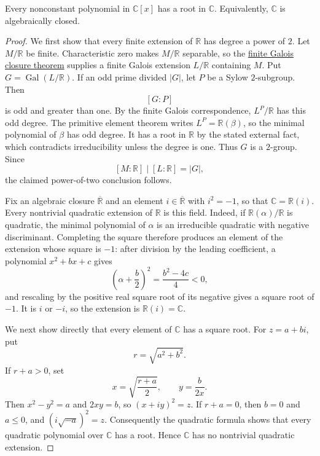 \begin{applicationtheorem}
Every nonconstant polynomial in \(\mathbb C[x]\) has a root in \(\mathbb C\).
Equivalently, \(\mathbb C\) is algebraically closed.
\end{applicationtheorem}
\begin{proof}
We first show that every finite extension of \(\mathbb R\) has degree a power
of \(2\).  Let \(M/\mathbb R\) be finite.  Characteristic zero makes
\(M/\mathbb R\) separable, so the
\hyperref[thm:finite-galois-closure]{finite Galois closure theorem} supplies
a finite Galois extension \(L/\mathbb R\) containing \(M\).  Put
\(G=\operatorname{Gal}(L/\mathbb R)\).
If an odd prime divided \(|G|\), let \(P\) be a Sylow \(2\)-subgroup.  Then
\[
[G:P]
\]
is odd and greater than one.  By the finite Galois correspondence,
\(L^P/\mathbb R\) has this odd degree.  The primitive element theorem writes
\(L^P=\mathbb R(\beta)\), so the minimal polynomial of \(\beta\) has odd
degree.  It has a root in \(\mathbb R\) by the stated external fact, which
contradicts irreducibility unless the degree is one.  Thus \(G\) is a
\(2\)-group.  Since
\[
[M:\mathbb R]\mid[L:\mathbb R]=|G|,
\]
the claimed power-of-two conclusion follows.

Fix an algebraic closure \(\overline{\mathbb R}\) and an element
\(i\in\overline{\mathbb R}\) with \(i^2=-1\), so that
\(\mathbb C=\mathbb R(i)\).  Every nontrivial quadratic extension of
\(\mathbb R\) is this field.  Indeed, if \(\mathbb R(\alpha)/\mathbb R\) is
quadratic, the minimal polynomial of \(\alpha\) is an irreducible quadratic
with negative discriminant.  Completing the square therefore produces an
element of the extension whose square is \(-1\): after division by the
leading coefficient, a polynomial \(x^2+bx+c\) gives
\[
\left(\alpha+\frac b2\right)^2=\frac{b^2-4c}{4}<0,
\]
and rescaling by the positive real square root of its negative gives a square
root of \(-1\).  It is \(i\) or \(-i\), so the extension is
\(\mathbb R(i)=\mathbb C\).

We next show directly that every element of \(\mathbb C\) has a square root.
For \(z=a+bi\), put
\[
r=\sqrt{a^2+b^2}.
\]
If \(r+a>0\), set
\[
x=\sqrt{\frac{r+a}{2}},
\qquad
y=\frac{b}{2x}.
\]
Then \(x^2-y^2=a\) and \(2xy=b\), so \((x+iy)^2=z\).  If \(r+a=0\), then
\(b=0\) and \(a\leq0\), and \((i\sqrt{-a})^2=z\).  Consequently the
quadratic formula shows that every quadratic polynomial over \(\mathbb C\)
has a root.  Hence \(\mathbb C\) has no nontrivial quadratic extension.


\end{proof}

